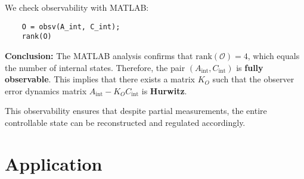 \documentclass[]{report}
\begin{document}
We check observability with MATLAB:

\begin{verbatim}
	O = obsv(A_int, C_int);
	rank(O)
\end{verbatim}

\textbf{Conclusion:}  
The MATLAB analysis confirms that $\text{rank}(\mathcal{O}) = 4$, which equals the number of internal states. Therefore, the pair $(A_{\text{int}}, C_{\text{int}})$ is \textbf{fully observable}. This implies that there exists a matrix $K_O$ such that the observer error dynamics matrix $A_{\text{int}} - K_O C_{\text{int}}$ is \textbf{Hurwitz}.


This observability ensures that despite partial measurements, the entire controllable state can be reconstructed and regulated accordingly.




\chapter{Application}
\end{document}
